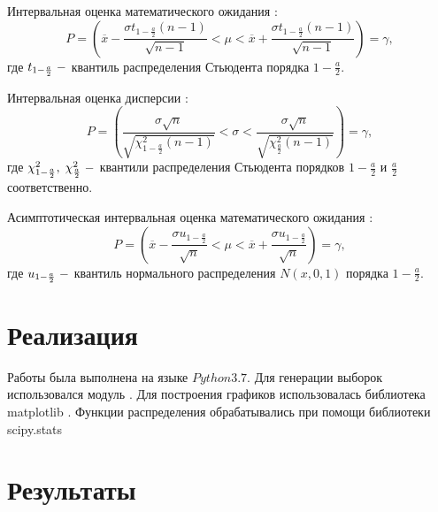 \documentclass[a4]{article}
\begin{document}
Интервальная оценка математического ожидания \cite{8_4}:
\begin{equation}
    P=\left(\overline{x}-\frac{\sigma t_{1-\frac{a}{2}}(n-1)}{\sqrt{n-1}}<\mu<\overline{x}+\frac{\sigma t_{1-\frac{a}{2}}(n-1)}{\sqrt{n-1}}\right) = \gamma,
\end{equation}
где $t_{1-\frac{a}{2}}\;\--$ квантиль распределения Стьюдента порядка $1-\frac{a}{2}.$

Интервальная оценка дисперсии \cite{8_2}:
\begin{equation}
    P=\left(\frac{\sigma\sqrt{n}}{\sqrt{\chi^2_{1-\frac{a}{2}}(n-1)}}<\sigma<\frac{\sigma\sqrt{n}}{\sqrt{\chi^2_\frac{a}{2}(n-1)}}\right) = \gamma,
\end{equation}
где $\chi_{1-\frac{a}{2}}^2,\;\chi_\frac{a}{2}^2\;\--$ квантили распределения Стьюдента порядков $1-\frac{a}{2}$ и $\frac{a}{2}$ соответственно.

Асимптотическая интервальная оценка математического ожидания \cite{8_2}:
\begin{equation}
    P = \left(\overline{x}-\frac{\sigma u_{1-\frac{a}{2}}}{\sqrt{n}}<\mu<\overline{x}+\frac{\sigma u_{1-\frac{a}{2}}}{\sqrt{n}}\right)=\gamma,
\end{equation}
где $u_{1-\frac{a}{2}}\;\--$ квантиль нормального распределения $N(x,0,1)$ порядка $1-\frac{a}{2}.$

\section{Реализация}
Работы была выполнена на языке $Python 3.7.$
Для генерации выборок использовался модуль \cite{numpy}.
Для построения графиков использовалась библиотека matplotlib \cite{plotlib}.
Функции распределения обрабатывались при помощи библиотеки scipy.stats \cite{skp}

\section{Результаты}
\end{document}

